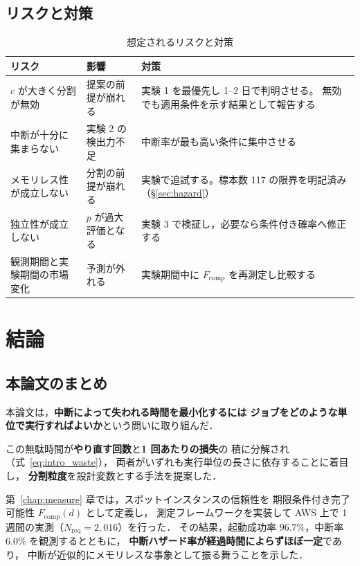 \documentclass[11pt,a4paper]{ltjsreport}
\newcommand{\Fcomp}{F_{\mathrm{comp}}}
\newcommand{\Nreq}{N_{\mathrm{req}}}
\begin{document}
\section{リスクと対策}

\begin{table}[htbp]
\centering
\caption{想定されるリスクと対策}
\label{tab:risks}
\small
\begin{tabularx}{\textwidth}{@{}XXX@{}}
\toprule
リスク & 影響 & 対策 \\
\midrule
$c$ が大きく分割が無効
  & 提案の前提が崩れる
  & 実験 1 を最優先し 1--2 日で判明させる。
    無効でも適用条件を示す結果として報告する \\
\addlinespace
中断が十分に集まらない
  & 実験 2 の検出力不足
  & 中断率が最も高い条件に集中させる \\
\addlinespace
メモリレス性が成立しない
  & 分割の前提が崩れる
  & 実験で追試する。標本数 117 の限界を明記済み
    （\S\ref{sec:hazard}） \\
\addlinespace
独立性が成立しない
  & $p$ が過大評価となる
  & 実験 3 で検証し，必要なら条件付き確率へ修正する \\
\addlinespace
観測期間と実験期間の市場変化
  & 予測が外れる
  & 実験期間中に $\Fcomp$ を再測定し比較する \\
\bottomrule
\end{tabularx}
\end{table}

\chapter{結論}
\label{chap:conclusion}

\section{本論文のまとめ}

本論文は，\textbf{中断によって失われる時間を最小化するには
ジョブをどのような単位で実行すればよいか}という問いに取り組んだ．

この無駄時間が\textbf{やり直す回数}と\textbf{1 回あたりの損失}の
積に分解され（式~\eqref{eq:intro_waste}），
両者がいずれも実行単位の長さに依存することに着目し，
\textbf{分割粒度}を設計変数とする手法を提案した．

第~\ref{chap:measure} 章では，スポットインスタンスの信頼性を
期限条件付き完了可能性 $\Fcomp(d)$ として定義し，
測定フレームワークを実装して
AWS 上で 1 週間の実測（$\Nreq = 2{,}016$）を行った．
その結果，起動成功率 $96.7\%$，中断率 $6.0\%$ を観測するとともに，
\textbf{中断ハザード率が経過時間によらずほぼ一定}であり，
中断が近似的にメモリレスな事象として振る舞うことを示した．
\end{document}
